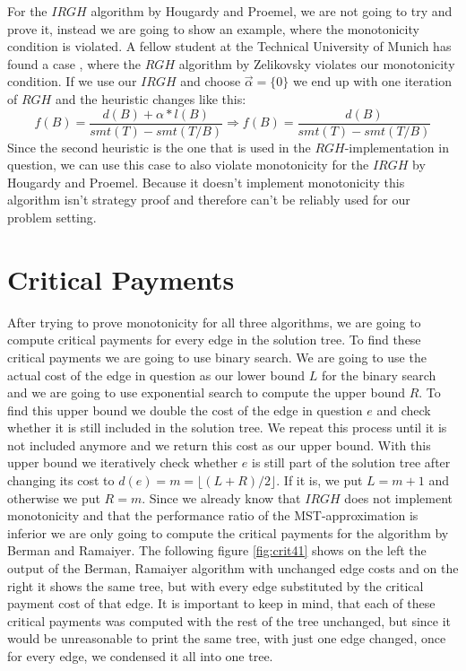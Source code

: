 For the $IRGH$ algorithm by Hougardy and Proemel, we are not going to try and prove it, instead we are going to show an example, where the monotonicity condition is violated. A fellow student at the Technical University of Munich has found a case \cite{guggenbichler20}, where the $RGH$ algorithm by Zelikovsky \cite{zelikovsky1996better} violates our monotonicity condition. If we use our $IRGH$ and choose $\vec{\alpha}=\{ 0\}$ we end up with one iteration of $RGH$ and the heuristic changes like this: 
$$f(B) = \frac{d(B) + \alpha * l(B)}{smt(T)-smt(T/B)} \Rightarrow f(B) = \frac{d(B)}{smt(T)-smt(T/B)}$$
Since the second heuristic is the one that is used in the $RGH$-implementation in question, we can use this case to also violate monotonicity for the $IRGH$ by Hougardy and Proemel. Because it doesn't implement monotonicity this algorithm isn't strategy proof and therefore can't be reliably used for our problem setting. 

\section{Critical Payments}

After trying to prove monotonicity for all three algorithms, we are going to compute critical payments for every edge in the solution tree. To find these critical payments we are going to use binary search. We are going to use the actual cost of the edge in question as our lower bound $L$ for the binary search and we are going to use exponential search to compute the upper bound $R$. 
To find this upper bound we double the cost of the edge in question $e$ and check whether it is still included in the solution tree. We repeat this process until it is not included anymore and we return this cost as our upper bound. With this upper bound we iteratively check whether $e$ is still part of the solution tree after changing its cost to $d(e)=m=\lfloor (L+R)/2\rfloor$. If it is, we put $L=m+1$ and otherwise we put $R=m$. Since we already know that $IRGH$ does not implement monotonicity and that the performance ratio of the MST-approximation is inferior we are only going to compute the critical payments for the algorithm by Berman and Ramaiyer. The following figure \ref{fig:crit41} shows on the left the output of the Berman, Ramaiyer algorithm with unchanged edge costs and on the right it shows the same tree, but with every edge substituted by the critical payment cost of that edge. It is important to keep in mind, that each of these critical payments was computed with the rest of the tree unchanged, but since it would be unreasonable to print the same tree, with just one edge changed, once for every edge, we condensed it all into one tree. 

